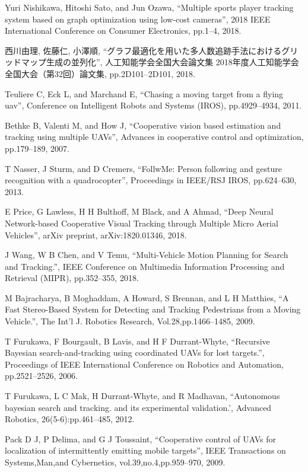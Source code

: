 \documentclass[autodetect-engine,dvipdfmx-if-dvi,ja=standard,a4j,jbase=11pt,magstyle=nomag*]{bxjsreport}
\begin{document}
% 
% 

\begin{thebibliography}{99}

Yuri Nishikawa, Hitoshi Sato, and Jun Ozawa, ``Multiple sports player tracking system based on graph optimization using low-cost cameras'', 2018 IEEE International Conference on Consumer Electronics, pp.1--4, 2018.

西川由理, 佐藤仁, 小澤順,  ``グラフ最適化を用いた多人数追跡手法におけるグリッドマップ生成の並列化'', 人工知能学会全国大会論文集 2018年度人工知能学会全国大会（第32回）論文集, pp.2D101--2D101, 2018.

Teuliere C, Eck L, and Marchand E, ``Chasing a moving target from a flying uav'', Conference on Intelligent Robots and Systems (IROS), pp.4929--4934, 2011.

Bethke B, Valenti M, and How J, ``Cooperative vision based estimation and tracking using multiple UAVs'', Advances in cooperative control and optimization, pp.179--189, 2007.

T Nasser, J Sturm, and D Cremers, ``FollwMe: Person following and gesture recognition with a quadrocopter'', Proceedings in IEEE/RSJ IROS, pp.624--630, 2013.

E Price, G Lawless, H H Bulthoff, M Black, and A Ahmad, ``Deep Neural Network-based Cooperative Visual Tracking through Multiple Micro Aerial Vehicles'', arXiv preprint, arXiv:1820.01346, 2018.

J Wang, W B Chen, and V Temu, ``Multi-Vehicle Motion Planning for Search and Tracking.'', IEEE Conference on Multimedia Information Processing and Retrieval (MIPR), pp.352--355, 2018.

M Bajracharya, B Moghaddam, A Howard, S Brennan, and L H Matthies, ``A Fast Stereo-Based System for Detecting and Tracking Pedestrians from a Moving Vehicle.'', The Int'l J. Robotics Research, Vol.28,pp.1466--1485, 2009.

T Furukawa, F Bourgault, B Lavis, and H F Durrant-Whyte, ``Recursive Bayesian search-and-tracking using coordinated UAVs for lost targets.'', Proceedings of IEEE International Conference on Robotics and Automation, pp.2521--2526, 2006.

T Furukawa, L C Mak, H Durrant-Whyte, and R Madhavan, ``Autonomous bayesian search and tracking. and its experimental validation.', Advanced Robotics, 26(5-6):pp.461--485, 2012.

Pack D J, P Delima, and G J Toussaint, ``Cooperative control of UAVs for localization of intermittently emitting mobile targets'', IEEE Transactions on Systems,Man,and Cybernetics, vol.39,no.4,pp.959--970, 2009.




\end{thebibliography}
\end{document}
